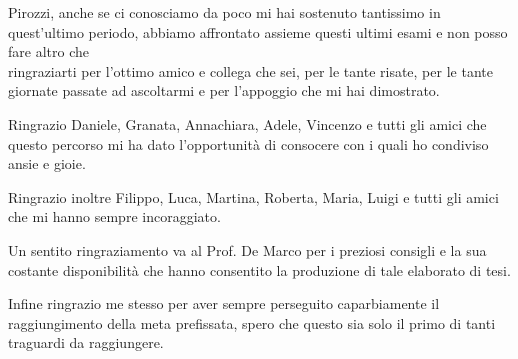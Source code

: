 \medskip
Pirozzi, anche se ci conosciamo da poco mi hai sostenuto tantissimo in quest'ultimo periodo, abbiamo affrontato assieme questi ultimi esami e non posso fare altro che \\ ringraziarti per l'ottimo amico e collega che sei, per le tante risate, per le tante giornate passate ad ascoltarmi e per l'appoggio che mi hai dimostrato.

\medskip
Ringrazio Daniele, Granata, Annachiara, Adele, Vincenzo e tutti gli amici che questo percorso mi ha dato l'opportunità di consocere con i quali ho condiviso ansie e gioie.

\medskip
Ringrazio  inoltre Filippo, Luca, Martina, Roberta, Maria, Luigi e tutti gli amici che mi hanno sempre incoraggiato.

\medskip
Un sentito ringraziamento va al Prof. De Marco per i preziosi consigli e la sua costante disponibilità che hanno consentito la produzione di tale elaborato di tesi.

\medskip
Infine ringrazio me stesso per aver sempre perseguito caparbiamente il  raggiungimento della meta prefissata, spero che questo sia solo il primo di tanti traguardi da raggiungere.